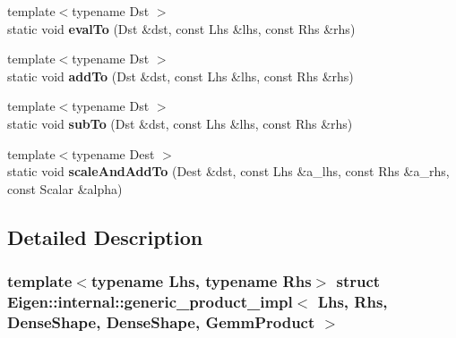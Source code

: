 \begin{DoxyCompactItemize}
\mbox{\label{struct_eigen_1_1internal_1_1generic__product__impl_3_01_lhs_00_01_rhs_00_01_dense_shape_00_01_def53e16cb724bbb32f6918835a9970bd5_aa89f104fd9e52d048200c7322f36da62}} 
{\footnotesize template$<$typename Dst $>$ }\\static void {\bfseries eval\+To} (Dst \&dst, const Lhs \&lhs, const Rhs \&rhs)
\item 
\mbox{\label{struct_eigen_1_1internal_1_1generic__product__impl_3_01_lhs_00_01_rhs_00_01_dense_shape_00_01_def53e16cb724bbb32f6918835a9970bd5_ac90997f3a150d53a3574604ca61403de}} 
{\footnotesize template$<$typename Dst $>$ }\\static void {\bfseries add\+To} (Dst \&dst, const Lhs \&lhs, const Rhs \&rhs)
\item 
\mbox{\label{struct_eigen_1_1internal_1_1generic__product__impl_3_01_lhs_00_01_rhs_00_01_dense_shape_00_01_def53e16cb724bbb32f6918835a9970bd5_a4ab7938d01c375e504756856e8cd9544}} 
{\footnotesize template$<$typename Dst $>$ }\\static void {\bfseries sub\+To} (Dst \&dst, const Lhs \&lhs, const Rhs \&rhs)
\item 
\mbox{\label{struct_eigen_1_1internal_1_1generic__product__impl_3_01_lhs_00_01_rhs_00_01_dense_shape_00_01_def53e16cb724bbb32f6918835a9970bd5_afdc6730448aab0a09ace45e90ae31634}} 
{\footnotesize template$<$typename Dest $>$ }\\static void {\bfseries scale\+And\+Add\+To} (Dest \&dst, const Lhs \&a\+\_\+lhs, const Rhs \&a\+\_\+rhs, const Scalar \&alpha)
\end{DoxyCompactItemize}


\subsection{Detailed Description}
\subsubsection*{template$<$typename Lhs, typename Rhs$>$\newline
struct Eigen\+::internal\+::generic\+\_\+product\+\_\+impl$<$ Lhs, Rhs, Dense\+Shape, Dense\+Shape, Gemm\+Product $>$}



